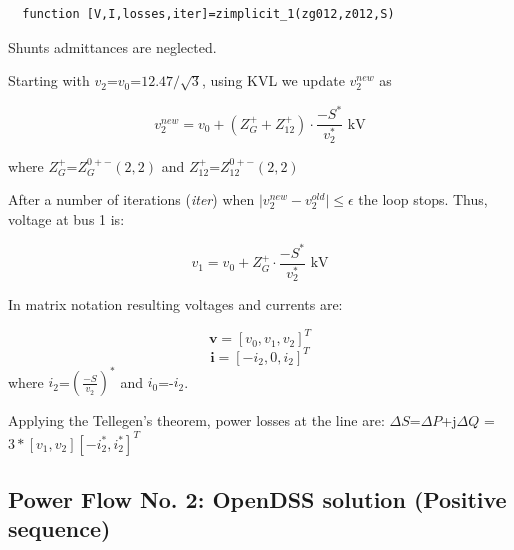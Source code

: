 \documentclass[12pt]{article}
\begin{document}
\begin{verbatim}
  function [V,I,losses,iter]=zimplicit_1(zg012,z012,S)
\end{verbatim}

Shunts admittances are neglected.

\begin{figure}[hbt]
\end{figure}
\newpage

Starting with ${v}_2$=$v_0$=$12.47/\sqrt{3}$, using KVL we update ${v}^{new}_2$ as

\begin{equation}
  {v}^{new}_2=v_0+({Z}^{+}_{G}+{Z}^{+}_{12})\cdot \frac{-{S}^*}{{v}^*_2}\mbox{ kV}
\end{equation}

where ${Z}^{+}_{G}$=${Z}^{0+-}_{G}(2,2)$ and ${Z}^{+}_{12}$=${Z}^{0+-}_{12}(2,2)$

After a number of iterations (\textit{iter}) when $\mid{v}^{new}_2-{v}^{old}_2\mid\leq \epsilon$ the loop stops. Thus, voltage at bus 1 is:

\begin{equation}
  {v}_1=v_0+{Z}^{+}_{G}\cdot \frac{-{S}^*}{{v}^*_2}\mbox{ kV}
\end{equation}

In matrix notation resulting voltages and currents are:

\begin{equation}
  \bm{v}=[{v}_0, {v}_1,{v}_2]^T
\end{equation}
\begin{equation}
  \bm{i}=[-{i}_2,0,{i}_2]^T
\end{equation}
where ${i}_2$=$(\frac{-{S}}{{v}_2})^*$ and  ${i}_0$=-${i}_2$.

Applying the Tellegen's theorem, power losses at the line are: $\Delta {S}$=$\Delta P$+j$\Delta Q$
=$3*[{v}_1,{v}_2][-{i}^*_2,{i}^*_2]^T$

\subsection{Power Flow No. 2: OpenDSS solution (Positive sequence)}
\end{document}
